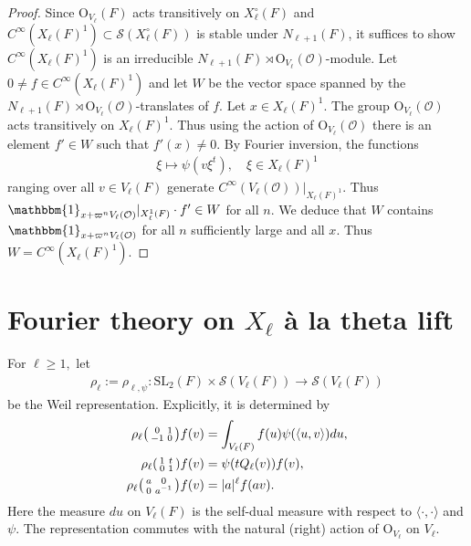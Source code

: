 \documentclass[11pt,a4paper,reqno]{amsart}
\theoremstyle{remark}
\numberwithin{equation}{section}
\newcommand{\SL}{\mathrm{SL}}
\newcommand{\OO}{\mathcal{O}}
\theoremstyle{definition}
\numberwithin{equation}{section}
\newcommand{\one}{\mathbbm{1}}
\newenvironment{psmatrix}
  {\left(\begin{smallmatrix}}
  {\end{smallmatrix}\right)}
\begin{document}
\begin{proof}
    Since $\mathrm{O}_{V_\ell}(F)$ acts transitively on $X_\ell^\circ(F)$ and $C^\infty(X_\ell(F)^1)\subset \mathcal{S}(X_\ell^\circ(F))$ is stable under $N_{\ell+1}(F)$, it suffices to show $C^\infty(X_\ell(F)^1)$ is an irreducible $N_{\ell+1}(F)\rtimes \mathrm{O}_{V_\ell}(\OO)$-module. Let $0  \neq f \in C^\infty(X_{\ell}(F)^1)$ and let $W$ be the vector space spanned by the $N_{\ell+1}(F)\rtimes \mathrm{O}_{V_\ell}(\OO)$-translates of $f.$ Let $x \in X_{\ell}(F)^1.$  
    The group $\mathrm{O}_{V_\ell}(\OO)$ acts transitively on $X_{\ell}(F)^1.$
    Thus using the action of $\mathrm{O}_{V_\ell}(\OO)$ there is an element $f' \in W$ such that $f'(x) \neq 0.$     By Fourier inversion, the functions
    \begin{align*}
        \xi\mapsto \psi(v\xi^t),\quad \xi\in X_\ell(F)^1 
    \end{align*}
    ranging over all $v\in V_{\ell}(F)$ generate $C^\infty(V_\ell(\OO))|_{X_\ell(F)^1}$.
    Thus $\one_{x+\varpi^n V_\ell(\OO)}|_{X_\ell^1(F)}\cdot f' \in W$ for all $n.$  We deduce that $W$ contains $\one_{x+\varpi^nV_{\ell}(\OO)}$ for all $n$ sufficiently large and all $x.$  Thus $W=C^\infty(X_\ell(F)^1).$ 
\end{proof}

\section{Fourier theory on $X_\ell$ \`a la theta lift}\label{sec:thetalift}


 For $\ell\ge 1,$ let 
\begin{align*}  \rho_\ell:=\rho_{\ell,\psi}:\SL_2(F)\times\mathcal{S}
(V_\ell(F))\to \mathcal{S}
(V_\ell(F))\end{align*}
be the Weil representation. Explicitly, it is determined by
\begin{align*}
    \rho_\ell\begin{psmatrix}
        0 & 1\\ 
        -1 & 0
    \end{psmatrix}f(v)&=\int_{V_\ell(F)} f(u)\psi(\langle u,v\rangle)du,\\
    \rho_\ell\begin{psmatrix}
        1 & t \\
        0 & 1
    \end{psmatrix}f(v)&=\psi(tQ_\ell(v))f(v),\\
    \rho_\ell \begin{psmatrix}
        a & 0\\ 
        0 & a^{-1}
    \end{psmatrix}f(v)&=|a|^\ell f(av).
\end{align*}
Here the measure $du$ on $V_\ell(F)$ is the self-dual measure with
respect to $\langle \cdot,\cdot\rangle$ and $\psi$. The representation commutes with the natural (right) action of $\mathrm{O}_{V_\ell}$ on $V_\ell$. 
\end{document}
